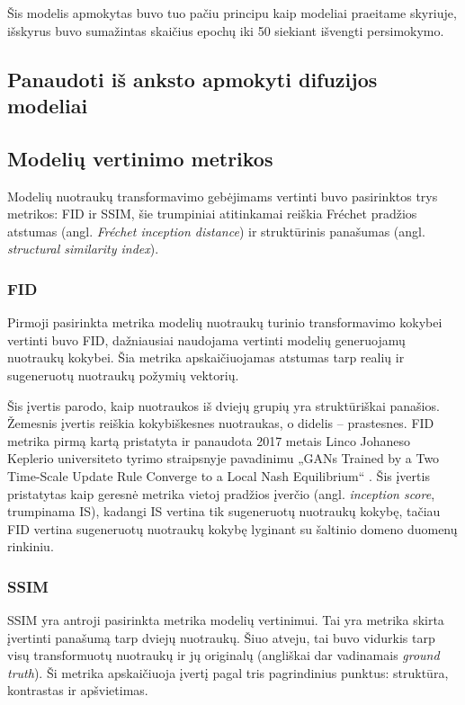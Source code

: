 \documentclass{VUMIFPSbakalaurinis}
\begin{document}
            Šis modelis apmokytas buvo tuo pačiu principu kaip modeliai praeitame skyriuje, išskyrus buvo sumažintas skaičius epochų iki 50 siekiant išvengti persimokymo.

    \subsection{Panaudoti iš anksto apmokyti difuzijos modeliai}
        
    \subsection{Modelių vertinimo metrikos}
        Modelių nuotraukų transformavimo gebėjimams vertinti buvo pasirinktos trys metrikos: FID ir SSIM, šie trumpiniai atitinkamai reiškia Fréchet pradžios atstumas (angl. \emph{Fréchet inception distance}) ir struktūrinis panašumas (angl. \emph{structural similarity index}).
        
        \subsubsection{FID}
            Pirmoji pasirinkta metrika modelių nuotraukų turinio transformavimo kokybei vertinti buvo FID, dažniausiai naudojama vertinti modelių generuojamų nuotraukų kokybei. Šia metrika apskaičiuojamas atstumas tarp realių ir sugeneruotų nuotraukų požymių vektorių.
    
            Šis įvertis parodo, kaip nuotraukos iš dviejų grupių yra struktūriškai panašios. Žemesnis įvertis reiškia kokybiškesnes nuotraukas, o didelis – prastesnes. FID metrika pirmą kartą pristatyta ir panaudota 2017 metais Linco Johaneso Keplerio universiteto tyrimo straipsnyje pavadinimu „GANs Trained by a Two Time-Scale Update Rule Converge to a Local Nash Equilibrium“ \cite{FidStart}. Šis įvertis pristatytas kaip geresnė metrika vietoj pradžios įverčio (angl. \emph{inception score}, trumpinama IS), kadangi IS vertina tik sugeneruotų nuotraukų kokybę, tačiau FID vertina sugeneruotų nuotraukų kokybę lyginant su šaltinio domeno duomenų rinkiniu.

        \subsubsection{SSIM}
            SSIM \cite{SSIM} yra antroji pasirinkta metrika modelių vertinimui. Tai yra metrika skirta įvertinti panašumą tarp dviejų nuotraukų. Šiuo atveju, tai buvo vidurkis tarp visų transformuotų nuotraukų ir jų originalų (angliškai dar vadinamais \emph{ground truth}). Ši metrika apskaičiuoja įvertį pagal tris pagrindinius punktus: struktūra, kontrastas ir apšvietimas.
\end{document}

